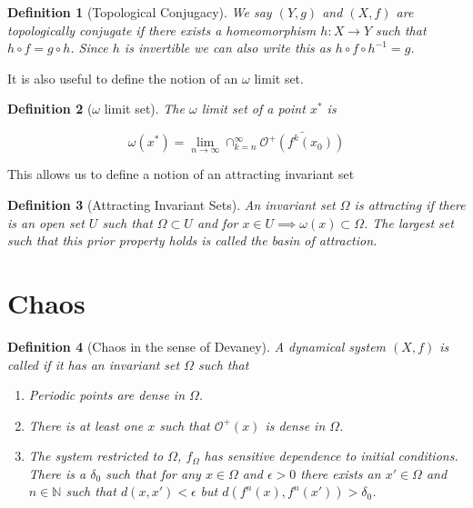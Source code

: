 \documentclass{article}
\newtheorem{definition}{Definition}
\begin{document}
\begin{definition}[Topological Conjugacy]
    We say $(Y,g)$ and $(X,f)$ are topologically conjugate if there exists a homeomorphism $h:X\rightarrow Y$ 
    such that $h \circ f = g \circ h$. Since $h$ is invertible we can also write this as 
    $h \circ f \circ h^{-1} = g$.
\end{definition}

It is also useful to define the notion of an $\omega$ limit set.

\begin{definition}[$\omega$ limit set]
    The $\omega$ limit set of a point $x^*$ is 

    \begin{equation*}
        \omega(x^*) = \lim_{n\rightarrow \infty}\cap_{k=n}^\infty \bar{\mathcal{O}^+(f^k(x_0))}
    \end{equation*}
\end{definition}

This allows us to define a notion of an attracting invariant set

\begin{definition}[Attracting Invariant Sets]
    An invariant set $\Omega$ is attracting if there is an open set $U$ such that $\Omega \subset U$ 
    and for $x \in U \implies \omega(x) \subset \Omega$. The largest set such that this prior 
    property holds is called the basin of attraction.
\end{definition}

\section*{Chaos}

\begin{definition}[Chaos in the sense of Devaney]
    A dynamical system $(X,f)$ is called if it has an invariant set $\Omega$ such that 

    \begin{enumerate}
        \item Periodic points are dense in $\Omega$.
        \item There is at least one $x$ such that $\mathcal{O}^+(x)$ is dense in $\Omega$.
        \item The system restricted to $\Omega$, $f_\Omega$ has sensitive dependence to initial 
        conditions. There is a $\delta_0$ such that for any $x \in \Omega$ and $\epsilon > 0$ there 
        exists an $x' \in \Omega$ and $n \in \mathbb{N}$ such that $d(x,x') < \epsilon$ but $d(f^n(x),f^n(x')) > \delta_0$. 
    \end{enumerate}
\end{definition}
\end{document}
